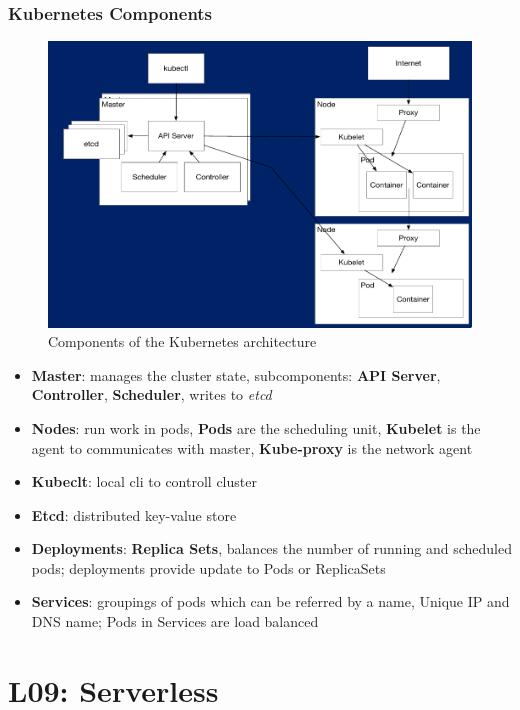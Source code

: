 \documentclass[a4paper]{article}
\begin{document}
\begin{multicols}{3}
\subsubsection*{Kubernetes Components}
\begin{figure}[H]
    \includegraphics[width=\linewidth]{KubernetesComponents.png}
    \caption{Components of the Kubernetes architecture}
    \label{fig:kubernetescomponents}
\end{figure}

\begin{itemize}
    \item \textbf{Master}: manages the cluster state, subcomponents: \textbf{API Server}, \textbf{Controller}, \textbf{Scheduler}, writes to \textit{etcd} 
    \item \textbf{Nodes}: run work in pods, \textbf{Pods} are the scheduling unit, \textbf{Kubelet} is the agent to communicates with master, \textbf{Kube-proxy} is the network agent
    \item \textbf{Kubeclt}: local cli to controll cluster
    \item \textbf{Etcd}: distributed key-value store
    \item \textbf{Deployments}: \textbf{Replica Sets}, balances the number of running and scheduled pods; deployments provide update to Pods or ReplicaSets
    \item \textbf{Services}: groupings of pods which can be referred by a name, Unique IP and DNS name; Pods in Services are load balanced 
\end{itemize}

\section*{L09: Serverless}


\end{multicols}
\end{document}
